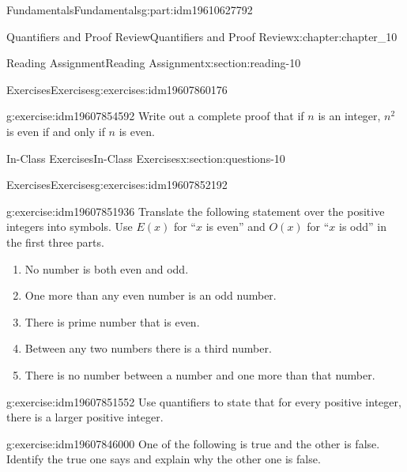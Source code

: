 \documentclass[oneside,10pt,]{book}
\numberwithin{equation}{section}
\begin{document}
\begin{partptx}{Fundamentals}{}{Fundamentals}{}{}{g:part:idm19610627792}
\begin{chapterptx}{Quantifiers and Proof Review}{}{Quantifiers and Proof Review}{}{}{x:chapter:chapter_10}
\begin{sectionptx}{Reading Assignment}{}{Reading Assignment}{}{}{x:section:reading-10}
\begin{exercises-subsection-numberless}{Exercises}{}{Exercises}{}{}{g:exercises:idm19607860176}
\begin{exercisegroup}
\begin{divisionexerciseeg}{2}{}{}{g:exercise:idm19607854592}
Write out a complete proof that if \(n\) is an integer, \(n^2\) is even if and only if \(n\) is even.%
\end{divisionexerciseeg}%
\end{exercisegroup}
\par\medskip\noindent
\end{exercises-subsection-numberless}
\end{sectionptx}
%
%
\typeout{************************************************}
\typeout{************************************************}
%
\begin{sectionptx}{In-Class Exercises}{}{In-Class Exercises}{}{}{x:section:questions-10}
%
%
%
\typeout{************************************************}
\typeout{************************************************}
%
\begin{exercises-subsection-numberless}{Exercises}{}{Exercises}{}{}{g:exercises:idm19607852192}
\par\medskip\noindent%
%
\begin{exercisegroup}
\begin{divisionexerciseeg}{1}{}{}{g:exercise:idm19607851936}%
Translate the following statement over the positive integers into symbols. Use \(E(x)\) for ``\(x\) is even'' and \(O(x)\) for ``\(x\) is odd'' in the first three parts.%
\begin{enumerate}[label=(\alph*)]
\item{}No number is both even and odd.%
\item{}One more than any even number is an odd number.%
\item{}There is prime number that is even.%
\item{}Between any two numbers there is a third number.%
\item{}There is no number between a number and one more than that number.%
\end{enumerate}
%
\end{divisionexerciseeg}%
\begin{divisionexerciseeg}{2}{}{}{g:exercise:idm19607851552}%
Use quantifiers to state that for every positive integer, there is a larger positive integer.%
\end{divisionexerciseeg}%
\begin{divisionexerciseeg}{3}{}{}{g:exercise:idm19607846000}%
One of the following is true and the other is false.  Identify the true one says and explain why the other one is false.%
\begin{gather*}

\end{gather*}
\end{divisionexerciseeg}
\end{exercisegroup}
\end{exercises-subsection-numberless}
\end{sectionptx}
\end{chapterptx}
\end{partptx}
\end{document}
